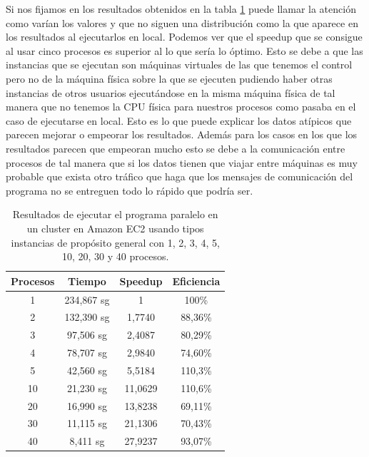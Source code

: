 \documentclass{article}
\begin{document}
	Si nos fijamos en los resultados obtenidos en la tabla \ref{tab:resultadosClusterM} puede llamar la atención como varían los valores y que no siguen una distribución como la que aparece en los resultados al ejecutarlos en local. Podemos ver que el speedup que se consigue al usar cinco procesos es superior al lo que sería lo óptimo. Esto se debe a que las instancias que se ejecutan son máquinas virtuales de las que tenemos el control pero no de la máquina física sobre la que se ejecuten pudiendo haber otras instancias de otros usuarios ejecutándose en la misma máquina física de tal manera que no tenemos la CPU física para nuestros procesos como pasaba en el caso de ejecutarse en local. Esto es lo que puede explicar los datos atípicos que parecen mejorar o empeorar los resultados. Además para los casos en los que los resultados parecen que empeoran mucho esto se debe a la comunicación entre procesos de tal manera que si los datos tienen que viajar entre máquinas es muy probable que exista otro tráfico que haga que los mensajes de comunicación del programa no se entreguen todo lo rápido que podría ser.
	
\begin{table}[h]
	\begin{center}
		\caption{Resultados de ejecutar el programa paralelo en un cluster en Amazon EC2 usando tipos instancias de propósito general con 1, 2, 3, 4, 5, 10, 20, 30 y 40 procesos.}
		\begin{tabular}{|c|c|c|c|}
\hline
\textbf{Procesos} &
\textbf{Tiempo} &
\textbf{Speedup} &
\textbf{Eficiencia} \\ \hline
\hline
 1 &234,867 sg &  1          & 100\% \\ \hline
 2 &132,390 sg &  1,7740 & 88,36\% \\ \hline 
 3 & 97,506 sg &  2,4087 & 80,29\% \\ \hline
 4 & 78,707 sg &  2,9840 & 74,60\% \\ \hline
 5 & 42,560 sg &  5,5184 & 110,3\% \\ \hline
10 & 21,230 sg & 11,0629 & 110,6\% \\ \hline
20 & 16,990 sg &  13,8238& 69,11\% \\ \hline
30 & 11,115 sg & 21,1306 & 70,43\% \\ \hline
40 &  8,411 sg &  27,9237& 93,07\% \\ \hline
		\end{tabular}
		\label{tab:resultadosClusterM}
	\end{center}
\end{table}
\end{document}
